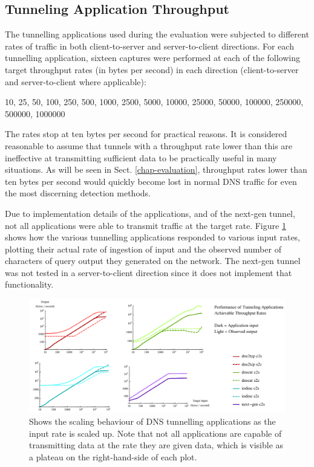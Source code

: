 \documentclass{llncs}
\begin{document}
\subsection{Tunneling Application Throughput}
\label{tunapptp}
The tunnelling applications used during the evaluation were subjected to
different rates of traffic in both client-to-server and server-to-client
directions. For each tunnelling application, sixteen captures were performed at
each of the following target throughput rates (in bytes per second) in each
direction (client-to-server and server-to-client where applicable):

10, 25, 50, 100, 250, 500, 1000, 2500, 5000, 10000, 25000, 50000, 100000,
250000, 500000, 1000000

The rates stop at ten bytes per second for practical reasons. It is considered
reasonable to assume that tunnels with a throughput rate lower than this are
ineffective at transmitting sufficient data to be practically useful in many
situations. As will be seen in Sect. \ref{chap-evaluation}, throughput rates
lower than ten bytes per second would quickly become lost in normal DNS
traffic for even the most discerning detection methods.

Due to implementation details of the applications, and of the next-gen tunnel,
not all applications were able to transmit traffic at the target rate. Figure
\ref{tunrates} shows how the various tunnelling applications responded to
various input rates, plotting their actual rate of ingestion of input and the
observed number of characters of query output they generated on the network.
The
next-gen tunnel was not tested in a server-to-client direction since it does not
implement that functionality.

\begin{figure}[h]
\centering
\includegraphics[width=\textwidth]{../figures/tunrates.pdf}
\caption[DNS Tunneling Application Throughput Scaling]{Shows the scaling
behaviour of DNS tunnelling applications as the input rate is scaled up. Note
that not all applications are capable of transmitting data at the rate they are
given data, which is visible as a plateau on the right-hand-side of each plot.}
\label{tunrates}
\end{figure}
\end{document}
